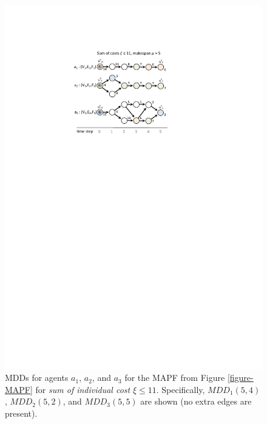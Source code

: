 \documentclass[jair,oneside,11pt]{article}
\begin{document}
\begin{figure}[h]
\centering
\includegraphics[trim={2.5cm 19cm 4cm 2.5cm},clip,width=1.0\textwidth]{fig_MDD.pdf}
\caption{MDDs for agents $a_1$, $a_2$, and $a_3$ for the MAPF from Figure
\ref{figure-MAPF} for \textit{sum of individual cost} $\xi\leq 11$. Specifically, $MDD_1(5,4)$, $MDD_2(5,2)$, and $MDD_3(5,5)$ are shown (no extra edges are present). }
\label{figure-MDD}
\end{figure}
\end{document}
